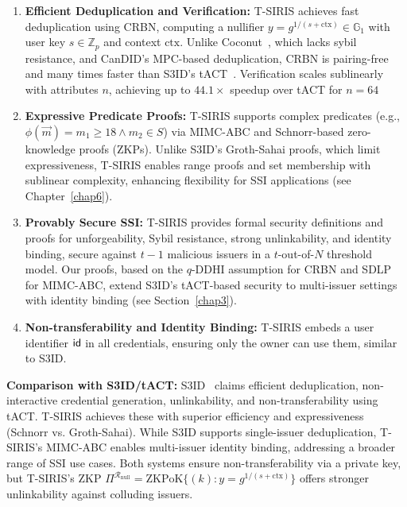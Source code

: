 \begin{enumerate}
    \item \textbf{Efficient Deduplication and Verification:} T-SIRIS achieves fast deduplication using CRBN, computing a nullifier $y = g^{1/(s + \text{ctx})} \in \mathbb{G}_1$ with user key $s \in \mathbb{Z}_p$ and context $\text{ctx}$. Unlike Coconut~\cite{sonnino_coconut_2020}, which lacks sybil resistance, and CanDID’s MPC-based deduplication, CRBN is pairing-free and many times faster than S3ID’s tACT~\cite{rabaninejad_attribute-based_2024}. Verification scales sublinearly with attributes $n$, achieving up to $44.1\times$ speedup over tACT for $n=64$ 
    
    \item \textbf{Expressive Predicate Proofs:} T-SIRIS supports complex predicates (e.g., $\phi(\vec{m}) = m_1 \geq 18 \wedge m_2 \in S$) via MIMC-ABC and Schnorr-based zero-knowledge proofs (ZKPs). Unlike S3ID’s Groth-Sahai proofs, which limit expressiveness, T-SIRIS enables range proofs and set membership with sublinear complexity, enhancing flexibility for SSI applications (see Chapter~\ref{chap6}).
    
    \item \textbf{Provably Secure SSI:} T-SIRIS provides formal security definitions and proofs for unforgeability, Sybil resistance, strong unlinkability, and identity binding, secure against $t-1$ malicious issuers in a $t$-out-of-$N$ threshold model. Our proofs, based on the $q$-DDHI assumption for CRBN and SDLP for MIMC-ABC, extend S3ID’s tACT-based security to multi-issuer settings with identity binding (see Section~\ref{chap3}).
    
    \item \textbf{Non-transferability and Identity Binding:} T-SIRIS embeds a user identifier $\mathsf{id}$ in all credentials, ensuring only the owner can use them, similar to S3ID. 
\end{enumerate}

\textbf{Comparison with S3ID/tACT:} S3ID~\cite{rabaninejad_attribute-based_2024} claims efficient deduplication, non-interactive credential generation, unlinkability, and non-transferability using tACT. T-SIRIS achieves these with superior efficiency and expressiveness (Schnorr vs. Groth-Sahai). While S3ID supports single-issuer deduplication, T-SIRIS’s MIMC-ABC enables multi-issuer identity binding, addressing a broader range of SSI use cases. Both systems ensure non-transferability via a private key, but T-SIRIS’s ZKP $\Pi^{\mathcal{R}_{\text{null}}} = \text{ZKPoK}\{(k): y = g^{1/(s + \text{ctx})}\}$ offers stronger unlinkability against colluding issuers.


